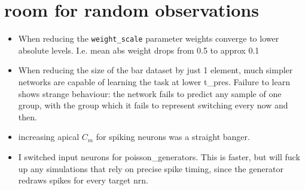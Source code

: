 \begin{figure}
    
\end{figure}




























\chapter{room for random observations}

\begin{itemize}
    \item When reducing the \texttt{weight\_scale} parameter weights converge to lower absolute levels. I.e. mean abs
          weight drops from 0.5 to approx 0.1
    \item When reducing the size of the bar dataset by just 1 element, much simpler networks are capable of learning the
          task at lower t\_pres. Failure to learn shows strange behaviour: the network fails to predict any sample of
          one group, with the group which it fails to represent switching every now and then.
    \item increasing apical $C_m$ for spiking neurons was a straight banger.
    \item I switched input neurons for poisson\_generators. This is faster, but will fuck up any simulations that rely
          on precise spike timing, since the generator redraws spikes for every target nrn.
\end{itemize}
